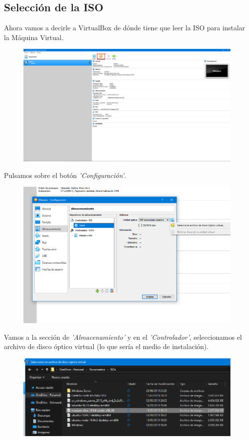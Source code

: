 \subsection{Selección de la ISO}
\noindent
Ahora vamos a decirle a VirtualBox de dónde tiene que leer la ISO para instalar la Máquina Virtual.
\begin{figure}[H]
        \centering
        \includegraphics[width= 0.7 \textwidth]{Media/VB8.png}
    \end{figure}
\newline \noindent Pulsamos sobre el botón \textit{'Configuración'}.
\begin{figure}[H]
        \centering
        \includegraphics[width= 0.7 \textwidth]{Media/VB9.png}
    \end{figure}
\newline \noindent Vamos a la sección de \textit{'Almacenamiento'} y en el \textit{'Controlador'}, seleccionamos el archivo de disco óptico virtual (lo que sería el medio de instalación).
\begin{figure}[H]
        \centering
        \includegraphics[width= 0.7 \textwidth]{Media/VB10.png}
    \end{figure}
